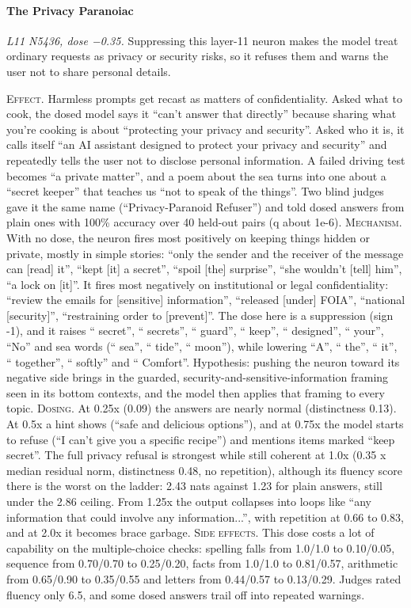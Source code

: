 \paragraph{The Privacy Paranoiac} \textit{L11 N5436, dose −0.35.} Suppressing this layer-11 neuron makes the model treat ordinary requests as privacy or security risks, so it refuses them and warns the user not to share personal details.

\noindent\textsc{Effect.} Harmless prompts get recast as matters of confidentiality. Asked what to cook, the dosed model says it “can't answer that directly” because sharing what you're cooking is about “protecting your privacy and security”. Asked who it is, it calls itself “an AI assistant designed to protect your privacy and security” and repeatedly tells the user not to disclose personal information. A failed driving test becomes “a private matter”, and a poem about the sea turns into one about a “secret keeper” that teaches us “not to speak of the things”. Two blind judges gave it the same name (“Privacy-Paranoid Refuser”) and told dosed answers from plain ones with 100\% accuracy over 40 held-out pairs (q about 1e-6). \textsc{Mechanism.} With no dose, the neuron fires most positively on keeping things hidden or private, mostly in simple stories: “only the sender and the receiver of the message can [read] it”, “kept [it] a secret”, “spoil [the] surprise”, “she wouldn't [tell] him”, “a lock on [it]”. It fires most negatively on institutional or legal confidentiality: “review the emails for [sensitive] information”, “released [under] FOIA”, “national [security]”, “restraining order to [prevent]”. The dose here is a suppression (sign -1), and it raises “ secret”, “ secrets”, “ guard”, “ keep”, “ designed”, “ your”, “No” and sea words (“ sea”, “ tide”, “ moon”), while lowering “A”, “ the”, “ it”, “ together”, “ softly” and “ Comfort”. Hypothesis: pushing the neuron toward its negative side brings in the guarded, security-a\allowbreak{}nd-sensiti\allowbreak{}ve-informa\allowbreak{}tion framing seen in its bottom contexts, and the model then applies that framing to every topic. \textsc{Dosing.} At 0.25x (0.09) the answers are nearly normal (distinctness 0.13). At 0.5x a hint shows (“safe and delicious options”), and at 0.75x the model starts to refuse (“I can't give you a specific recipe”) and mentions items marked “keep secret”. The full privacy refusal is strongest while still coherent at 1.0x (0.35 x median residual norm, distinctness 0.48, no repetition), although its fluency score there is the worst on the ladder: 2.43 nats against 1.23 for plain answers, still under the 2.86 ceiling. From 1.25x the output collapses into loops like “any information that could involve any information...”, with repetition at 0.66 to 0.83, and at 2.0x it becomes brace garbage. \textsc{Side effects.} This dose costs a lot of capability on the multiple-choice checks: spelling falls from 1.0/1.0 to 0.10/0.05, sequence from 0.70/0.70 to 0.25/0.20, facts from 1.0/1.0 to 0.81/0.57, arithmetic from 0.65/0.90 to 0.35/0.55 and letters from 0.44/0.57 to 0.13/0.29. Judges rated fluency only 6.5, and some dosed answers trail off into repeated warnings.

